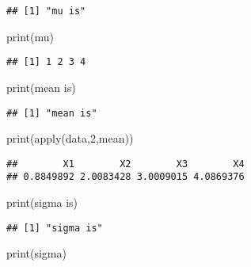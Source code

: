 \documentclass[
]{article}
\newenvironment{Shaded}{\begin{snugshade}}{\end{snugshade}}
\newcommand{\DecValTok}[1]{\textcolor[rgb]{0.00,0.00,0.81}{#1}}
\newcommand{\FunctionTok}[1]{\textcolor[rgb]{0.00,0.00,0.00}{#1}}
\newcommand{\NormalTok}[1]{#1}
\newcommand{\StringTok}[1]{\textcolor[rgb]{0.31,0.60,0.02}{#1}}
\begin{document}
\begin{verbatim}
## [1] "mu is"
\end{verbatim}

\begin{Shaded}
\begin{Highlighting}[]
\FunctionTok{print}\NormalTok{(mu)}
\end{Highlighting}
\end{Shaded}

\begin{verbatim}
## [1] 1 2 3 4
\end{verbatim}

\begin{Shaded}
\begin{Highlighting}[]
\FunctionTok{print}\NormalTok{(}\StringTok{\textquotesingle{}mean is\textquotesingle{}}\NormalTok{)}
\end{Highlighting}
\end{Shaded}

\begin{verbatim}
## [1] "mean is"
\end{verbatim}

\begin{Shaded}
\begin{Highlighting}[]
\FunctionTok{print}\NormalTok{(}\FunctionTok{apply}\NormalTok{(data,}\DecValTok{2}\NormalTok{,mean))}
\end{Highlighting}
\end{Shaded}

\begin{verbatim}
##        X1        X2        X3        X4 
## 0.8849892 2.0083428 3.0009015 4.0869376
\end{verbatim}

\begin{Shaded}
\begin{Highlighting}[]
\FunctionTok{print}\NormalTok{(}\StringTok{\textquotesingle{}sigma is\textquotesingle{}}\NormalTok{)}
\end{Highlighting}
\end{Shaded}

\begin{verbatim}
## [1] "sigma is"
\end{verbatim}

\begin{Shaded}
\begin{Highlighting}[]
\FunctionTok{print}\NormalTok{(sigma)}
\end{Highlighting}
\end{Shaded}
\end{document}
